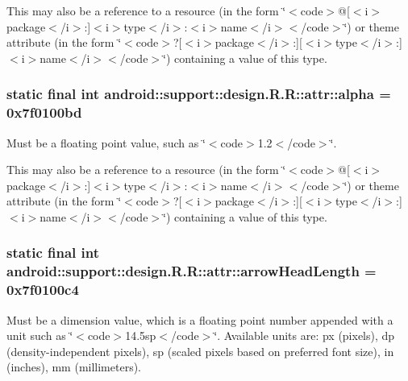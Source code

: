 This may also be a reference to a resource (in the form \char`\"{}$<$code$>$@\mbox{[}$<$i$>$package$<$/i$>$:\mbox{]}$<$i$>$type$<$/i$>$:$<$i$>$name$<$/i$>$$<$/code$>$\char`\"{}) or theme attribute (in the form \char`\"{}$<$code$>$?\mbox{[}$<$i$>$package$<$/i$>$:\mbox{]}\mbox{[}$<$i$>$type$<$/i$>$:\mbox{]}$<$i$>$name$<$/i$>$$<$/code$>$\char`\"{}) containing a value of this type. \hypertarget{classandroid_1_1support_1_1design_1_1_r_1_1attr_8706525cb7391a45985f7afeca547d84}{
\subsubsection[{alpha}]{\setlength{\rightskip}{0pt plus 5cm}static final int android::support::design.R.R::attr::alpha = 0x7f0100bd}}
\label{classandroid_1_1support_1_1design_1_1_r_1_1attr_8706525cb7391a45985f7afeca547d84}


Must be a floating point value, such as \char`\"{}$<$code$>$1.2$<$/code$>$\char`\"{}. 

This may also be a reference to a resource (in the form \char`\"{}$<$code$>$@\mbox{[}$<$i$>$package$<$/i$>$:\mbox{]}$<$i$>$type$<$/i$>$:$<$i$>$name$<$/i$>$$<$/code$>$\char`\"{}) or theme attribute (in the form \char`\"{}$<$code$>$?\mbox{[}$<$i$>$package$<$/i$>$:\mbox{]}\mbox{[}$<$i$>$type$<$/i$>$:\mbox{]}$<$i$>$name$<$/i$>$$<$/code$>$\char`\"{}) containing a value of this type. \hypertarget{classandroid_1_1support_1_1design_1_1_r_1_1attr_3e9f28d8f7e3919ba4f0cd80e4b309e5}{
\subsubsection[{arrowHeadLength}]{\setlength{\rightskip}{0pt plus 5cm}static final int android::support::design.R.R::attr::arrowHeadLength = 0x7f0100c4}}
\label{classandroid_1_1support_1_1design_1_1_r_1_1attr_3e9f28d8f7e3919ba4f0cd80e4b309e5}


Must be a dimension value, which is a floating point number appended with a unit such as \char`\"{}$<$code$>$14.5sp$<$/code$>$\char`\"{}. Available units are: px (pixels), dp (density-independent pixels), sp (scaled pixels based on preferred font size), in (inches), mm (millimeters). 

